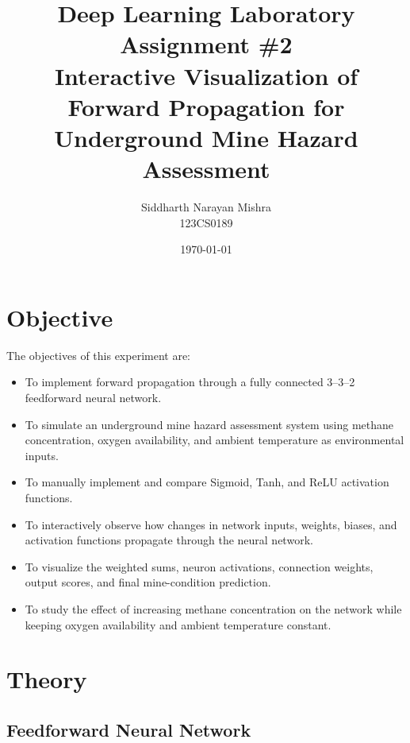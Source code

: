 \documentclass[12pt]{article}
\title{
    \textbf{Deep Learning Laboratory}\\
    \vspace{0.3cm}
    Assignment \#2\\
    \vspace{0.2cm}
    \large Interactive Visualization of Forward Propagation for\\
    Underground Mine Hazard Assessment
}
\author{
    Siddharth Narayan Mishra\\
    123CS0189
}
\date{\today}
\begin{document}
\maketitle

\tableofcontents

\newpage


\section{Objective}

The objectives of this experiment are:

\begin{itemize}
    \item To implement forward propagation through a fully connected
    3--3--2 feedforward neural network.

    \item To simulate an underground mine hazard assessment system using
    methane concentration, oxygen availability, and ambient temperature
    as environmental inputs.

    \item To manually implement and compare Sigmoid, Tanh, and ReLU
    activation functions.

    \item To interactively observe how changes in network inputs,
    weights, biases, and activation functions propagate through the
    neural network.

    \item To visualize the weighted sums, neuron activations, connection
    weights, output scores, and final mine-condition prediction.

    \item To study the effect of increasing methane concentration on
    the network while keeping oxygen availability and ambient
    temperature constant.
\end{itemize}


\section{Theory}

\subsection{Feedforward Neural Network}
\end{document}
